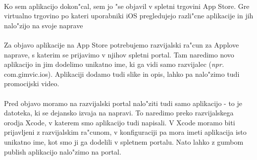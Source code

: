 \paragraph{}Ko sem aplikacijo dokon"cal, sem jo "se objavil v spletni trgovini App Store. Gre virtualno trgovino po kateri uporabniki iOS pregledujejo razli"cne aplikacije in jih nalo"zijo na svoje naprave 

\paragraph{}Za objavo aplikacije na App Store potrebujemo razvijalski ra"cun za Applove naprave, s katerim se prijavimo v njihov spletni portal. Tam naredimo novo aplikacijo in jim dodelimo unikatno ime, ki ga vidi samo razvijalec (\textit{npr.} com.gimvic.ios). Aplikaciji dodamo tudi slike in opis, lahko pa nalo"zimo tudi promocijski video.

\paragraph{}Pred objavo moramo na razvijalski portal nalo"ziti tudi samo aplikacijo - to je datoteka, ki se dejansko izvaja na napravi. To naredimo preko razvijalskega orodja Xcode, v katerem smo aplikacijo tudi napisali. V Xcode moramo biti prijavljeni z razvijalskim ra"cunom, v konfiguraciji pa mora imeti aplikacija isto unikatno ime, kot smo ji ga dodelili v spletnem portalu. Nato lahko z gumbom publish aplikacijo nalo"zimo na portal.
